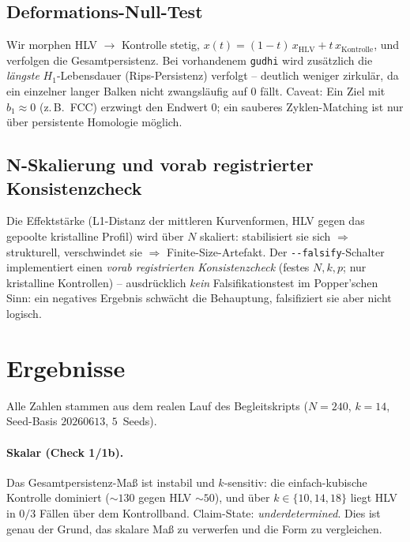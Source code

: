 \subsection{Deformations-Null-Test}
Wir morphen HLV $\to$ Kontrolle stetig, $x(t)=(1-t)\,x_{\mathrm{HLV}}
+ t\,x_{\mathrm{Kontrolle}}$, und verfolgen die Gesamtpersistenz. Bei
vorhandenem \texttt{gudhi} wird zusätzlich die \emph{längste}
$H_1$-Lebensdauer (Rips-Persistenz) verfolgt -- deutlich weniger zirkulär, da
ein einzelner langer Balken nicht zwangsläufig auf $0$ fällt. Caveat: Ein Ziel
mit $b_1\approx 0$ (z.\,B.\ FCC) erzwingt den Endwert $0$; ein sauberes
Zyklen-Matching ist nur über persistente Homologie möglich.

\subsection{N-Skalierung und vorab registrierter Konsistenzcheck}
Die Effektstärke (L1-Distanz der mittleren Kurvenformen, HLV gegen das
gepoolte kristalline Profil) wird über $N$ skaliert: stabilisiert sie sich
$\Rightarrow$ strukturell, verschwindet sie $\Rightarrow$ Finite-Size-Artefakt.
Der \texttt{-{}-falsify}-Schalter implementiert einen \emph{vorab
registrierten Konsistenzcheck} (festes $N,k,p$; nur kristalline Kontrollen) --
ausdrücklich \emph{kein} Falsifikationstest im Popper'schen Sinn: ein negatives
Ergebnis schwächt die Behauptung, falsifiziert sie aber nicht logisch.

\section{Ergebnisse}

Alle Zahlen stammen aus dem realen Lauf des Begleitskripts
($N=240$, $k=14$, Seed-Basis $20260613$, $5$~Seeds).

\paragraph{Skalar (Check 1/1b).} Das Gesamtpersistenz-Maß ist instabil und
$k$-sensitiv: die einfach-kubische Kontrolle dominiert
($\sim\!130$ gegen HLV $\sim\!50$), und über $k\in\{10,14,18\}$ liegt HLV in
$0/3$ Fällen über dem Kontrollband. Claim-State: \emph{underdetermined}. Dies
ist genau der Grund, das skalare Maß zu verwerfen und die Form zu vergleichen.

